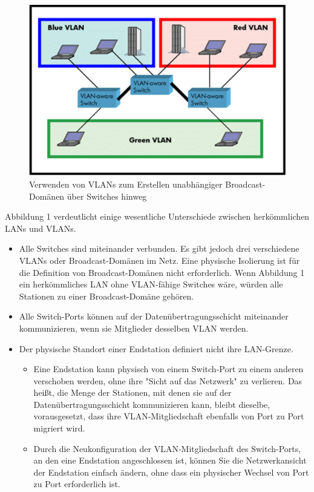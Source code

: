         \begin{figure}[ht]
            \centering
            \includegraphics{images/VLAN.png}
            \caption{Verwenden von VLANs zum Erstellen unabhängiger Broadcast-Domänen über Switches hinweg}
        \end{figure}
        Abbildung 1 verdeutlicht einige wesentliche Unterschiede zwischen herkömmlichen LANs und VLANs.
        \begin{itemize}
            \item Alle Switches sind miteinander verbunden. Es gibt jedoch drei verschiedene VLANs oder Broadcast-Domänen im Netz. Eine physische Isolierung ist für die Definition von Broadcast-Domänen nicht erforderlich. Wenn Abbildung 1 ein herkömmliches LAN ohne VLAN-fähige Switches wäre, würden alle Stationen zu einer Broadcast-Domäne gehören.
            \item Alle Switch-Ports können auf der Datenübertragungsschicht miteinander kommunizieren, wenn sie Mitglieder desselben VLAN werden.
            \item Der physische Standort einer Endstation definiert nicht ihre LAN-Grenze.
            \begin{itemize}
                \item Eine Endstation kann physisch von einem Switch-Port zu einem anderen verschoben werden, ohne ihre "Sicht auf das Netzwerk" zu verlieren. Das heißt, die Menge der Stationen, mit denen sie auf der Datenübertragungsschicht kommunizieren kann, bleibt dieselbe, vorausgesetzt, dass ihre VLAN-Mitgliedschaft ebenfalls von Port zu Port migriert wird.
                \item Durch die Neukonfiguration der VLAN-Mitgliedschaft des Switch-Ports, an den eine Endstation angeschlossen ist, können Sie die Netzwerkansicht der Endstation einfach ändern, ohne dass ein physischer Wechsel von Port zu Port erforderlich ist.
            \end{itemize}
        \end{itemize}

